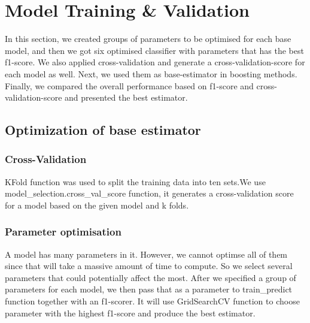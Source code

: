 \documentclass{article}
\begin{document}
\section{Model Training \& Validation}
In this section, we created groups of parameters to be optimised for each base model, and then we got six optimised classifier with parameters that has the best f1-score. We also applied cross-validation and generate a cross-validation-score for each model as well. Next, we used them as base-estimator in boosting methods. Finally, we compared the overall performance based on f1-score and cross-validation-score and presented the best estimator.
\subsection{Optimization of base estimator}

\subsubsection{Cross-Validation}
KFold function was used to split the training data into ten sets.We use model\_selection.cross\_val\_score function, it generates a cross-validation score for a model based on the given model and k folds. 

\subsubsection{Parameter optimisation}
A model has many parameters in it. However, we cannot optimse all of them since that will take a massive amount of time to compute. So we select several parameters that could potentially affect the most.
After we specified a group of parameters for each model, we then pass that as a parameter to train\_predict function together with an f1-scorer. It will use GridSearchCV function to choose parameter with the highest f1-score and produce the best estimator. 
\end{document}
